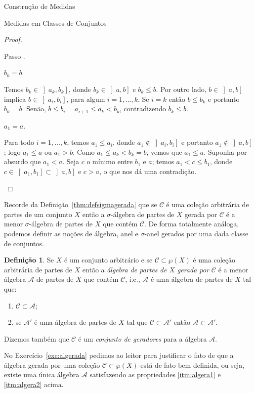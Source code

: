 \documentclass[oneside,final,11pt]{amsbook}
\newcounter{contastep}
\newenvironment{stepindent}{\setcounter{contastep}{1}
\begin{list} {Passo \arabic{contastep}.}
{\usecounter{contastep}
\setlength{\leftmargin}{10pt}
\setlength{\rightmargin}{10pt}
\setlength{\labelsep}{5pt}
\setlength{\itemsep}{10pt}
\setlength{\topsep}{10pt}}}
{\end{list}}
\theoremstyle{remark}\newtheorem{exercise}{Exercício}[chapter]
\theoremstyle{remark}\newtheorem{*exercise}[exercise]{\hbox to 0pt{\hskip 0pt minus 1fil*}Exercício}
\theoremstyle{definition}\newtheorem{exdefin}{Definição}[chapter]
\theoremstyle{plain}\newtheorem{teo}{Teorema}[section]
\theoremstyle{plain}\newtheorem{lem}[teo]{Lema}
\theoremstyle{plain}\newtheorem{prop}[teo]{Proposição}
\theoremstyle{plain}\newtheorem{cor}[teo]{Corolário}
\theoremstyle{definition}\newtheorem{defin}[teo]{Definição}
\theoremstyle{remark}\newtheorem{rem}[teo]{Observação}
\theoremstyle{definition}\newtheorem{notation}[teo]{Notação}
\theoremstyle{definition}\newtheorem{convention}[teo]{Convenção}
\theoremstyle{definition}\newtheorem{example}[teo]{Exemplo}
\numberwithin{section}{chapter}
\numberwithin{equation}{section}
\begin{document}
\begin{chapter}{Construção de Medidas}
\begin{section}{Medidas em Classes de Conjuntos}
\begin{proof}
\begin{stepindent}
\item {\em $b_k=b$}.

Temos $b_k\in\left]a_k,b_k\right]$, donde $b_k\in\left]a,b\right]$ e $b_k\le b$. Por outro lado,
$b\in\left]a,b\right]$ implica $b\in\left]a_i,b_i\right]$, para algum $i=1,\ldots,k$. Se $i=k$ então
$b\le b_k$ e portanto $b_k=b$. Senão, $b\le b_i=a_{i+1}\le a_k<b_k$, contradizendo $b_k\le b$.

\item {\em $a_1=a$}.

Para todo $i=1,\ldots,k$, temos $a_1\le a_i$, donde $a_1\not\in\left]a_i,b_i\right]$ e portanto
$a_1\not\in\left]a,b\right]$; logo $a_1\le a$ ou $a_1>b$.
Como $a_1\le a_k<b_k=b$, vemos que $a_1\le a$. Suponha por absurdo que
$a_1<a$. Seja $c$ o mínimo entre $b_1$ e $a$; temos $a_1<c\le b_1$, donde $c\in\left]a_1,b_1\right]\subset\left]a,b\right]$
e $c>a$, o que nos dá uma contradição.\qedhere
\end{stepindent}
\end{proof}

Recorde da Definição~\ref{thm:defsigmagerada} que se $\mathcal C$ é uma coleção arbitrária de partes de um conjunto
$X$ então a $\sigma$-álgebra de partes de $X$ gerada por $\mathcal C$ é a menor $\sigma$-álgebra de partes de $X$
que contém $\mathcal C$. De forma totalmente análoga, podemos definir as noções de álgebra, anel e $\sigma$-anel
gerados por uma dada classe de conjuntos.
\begin{defin}\label{thm:defalgerada}
Se $X$ é um conjunto arbitrário e se $\mathcal C\subset\wp(X)$ é uma coleção arbitrária de partes de $X$ então
a {\em álgebra de partes de $X$ gerada por $\mathcal C$\/} é a menor álgebra $\mathcal A$ de partes de $X$ que contém $\mathcal C$, i.e., $\mathcal A$ é uma
álgebra de partes de $X$ tal que:
\begin{enumerate}
\item\label{itm:algera1} $\mathcal C\subset\mathcal A$;
\item\label{itm:algera2} se $\mathcal A'$ é uma álgebra de partes de $X$ tal que $\mathcal C\subset\mathcal A'$ então
$\mathcal A\subset\mathcal A'$.
\end{enumerate}
Dizemos também que $\mathcal C$ é um
{\em conjunto de geradores\/}
para a álgebra $\mathcal A$.
\end{defin}
No Exercício~\ref{exe:algerada} pedimos ao leitor para justificar o fato de que a álgebra
gerada por uma coleção $\mathcal C\subset\wp(X)$ está de fato bem definida,
ou seja, existe uma única álgebra $\mathcal A$ satisfazendo as propriedades \eqref{itm:algera1} e \eqref{itm:algera2}
acima.


\end{section}
\end{chapter}
\end{document}
